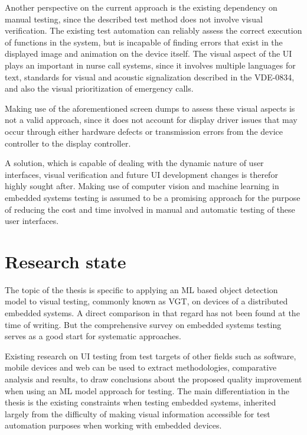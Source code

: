 \documentclass[Proposal,BIC,english,IEEE]{BASE/twbook} %
\begin{document}
Another perspective on the current approach is the existing dependency on manual testing, since the described test method does not involve visual verification. The existing test automation can reliably assess the correct execution of functions in the system, but is incapable of finding errors that exist in the displayed image and animation on the device itself.
The visual aspect of the UI plays an important in nurse call systems, since it involves multiple languages for text, standards for visual and acoustic signalization described in the VDE-0834, and also the visual prioritization of emergency calls.

Making use of the aforementioned screen dumps to assess these visual aspects is not a valid approach, since it does not account for display driver issues that may occur through either hardware defects or transmission errors from the device controller to the display controller.

A solution, which is capable of dealing with the dynamic nature of user interfaces, visual verification and future UI development changes is therefor highly sought after. Making use of computer vision and machine learning in embedded systems testing is assumed to be a promising approach for the purpose of reducing the cost and time involved in manual and automatic testing of these user interfaces.
\clearpage
\newpage
\pagestyle{plain}
\chapter{Research state}
The topic of the thesis is specific to applying an ML based object detection model to visual testing, commonly known as VGT, on devices of a distributed embedded systems. A direct comparison in that regard has not been found at the time of writing. But the comprehensive survey on embedded systems testing \autocite{garousiTestingEmbeddedSoftware2018} serves as a good start for systematic approaches.

Existing research on UI testing from test targets of other fields such as software, mobile devices and web can be used to extract methodologies, comparative analysis and results, to draw conclusions about the proposed quality improvement when using an ML model approach for testing. The main differentiation in the thesis is the existing constraints when testing embedded systems, inherited largely from the difficulty of making visual information accessible for test automation purposes when working with embedded devices.
\end{document}
